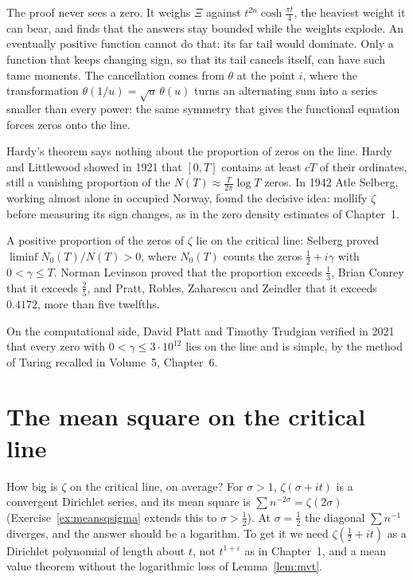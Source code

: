 \begin{beauty}
The proof never sees a zero. It weighs $\Xi$ against $t^{2n}\cosh\frac{\pi t}4$, the heaviest weight it can bear, and finds that the answers stay bounded while the weights explode. An eventually positive function cannot do that: its far tail would dominate. Only a function that keeps changing sign, so that its tail cancels itself, can have such tame moments. The cancellation comes from $\theta$ at the point $i$, where the transformation $\theta(1/u)=\sqrt u\,\theta(u)$ turns an alternating sum into a series smaller than every power: the same symmetry that gives the functional equation forces zeros onto the line.
\end{beauty}

Hardy's theorem says nothing about the proportion of zeros on the line. Hardy and Littlewood showed in 1921 that $[0,T]$ contains at least $cT$ of their ordinates, still a vanishing proportion of the $N(T)\approx\frac T{2\pi}\log T$ zeros. In 1942 Atle Selberg, working almost alone in occupied Norway, found the decisive idea: mollify $\zeta$ before measuring its sign changes, as in the zero density estimates of Chapter~1.

\begin{theorem}\label{thm:proportion}
A positive proportion of the zeros of $\zeta$ lie on the critical line: Selberg proved $\liminf N_0(T)/N(T)>0$, where $N_0(T)$ counts the zeros $\frac12+i\gamma$ with $0<\gamma\le T$. Norman Levinson proved that the proportion exceeds $\frac13$, Brian Conrey that it exceeds $\frac25$, and Pratt, Robles, Zaharescu and Zeindler that it exceeds $0.4172$, more than five twelfths.
\end{theorem}

On the computational side, David Platt and Timothy Trudgian verified in 2021 that every zero with $0<\gamma\le3\cdot10^{12}$ lies on the line and is simple, by the method of Turing recalled in Volume~5, Chapter~6.

\section{The mean square on the critical line}

How big is $\zeta$ on the critical line, on average? For $\sigma>1$, $\zeta(\sigma+it)$ is a convergent Dirichlet series, and its mean square is $\sum n^{-2\sigma}=\zeta(2\sigma)$ (Exercise~\ref{ex:meansqsigma} extends this to $\sigma>\frac12$). At $\sigma=\frac12$ the diagonal $\sum n^{-1}$ diverges, and the answer should be a logarithm. To get it we need $\zeta(\frac12+it)$ as a Dirichlet polynomial of length about $t$, not $t^{1+\varepsilon}$ as in Chapter~1, and a mean value theorem without the logarithmic loss of Lemma~\ref{lem:mvt}.

